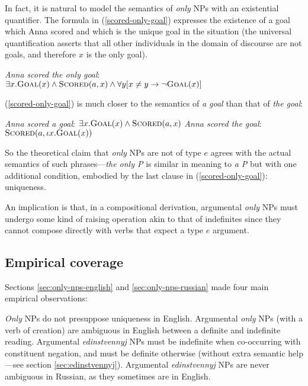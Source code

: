 In fact, it is natural to model the semantics of \textit{only} NPs with an existential quantifier. The formula in (\ref{scored-only-goal}) expresses the existence of a goal which Anna scored and which is the unique goal in the situation (the universal quantification asserts that all other individuals in the domain of discourse are not goals, and therefore $x$ is the only goal).

\begin{exe}
	\ex \label{scored-only-goal} \textit{Anna scored the only goal}: \\ $\exists x . \textsc{Goal}(x) \land \textsc{Scored}(a, x) \land \forall y [ x \ne y \to \neg \textsc{Goal}(x) ] $
\end{exe}

(\ref{scored-only-goal}) is much closer to the semantics of \textit{a goal} than that of \textit{the goal}:

\begin{exe}
	\ex \label{a-goal} \textit{Anna scored a goal}: $\exists x . \textsc{Goal}(x) \land \textsc{Scored}(a, x)$
	\ex \label{the-goal} \textit{Anna scored the goal}: $\textsc{Scored}(a, \iota x . \textsc{Goal}(x))$
\end{exe}

So the theoretical claim that \textit{only} NPs are not of type $e$ agrees with the actual semantics of such phrases---\textit{the only P} is similar in meaning to \textit{a P} but with one additional condition, embodied by the last clause in (\ref{scored-only-goal}): uniqueness.

An implication is that, in a compositional derivation, argumental \textit{only} NPs must undergo some kind of raising operation akin to that of indefinites since they cannot compose directly with verbs that expect a type $e$ argument.

\subsection{Empirical coverage}
Sections \ref{sec:only-nps-english} and \ref{sec:only-nps-russian} made four main empirical observations:

\begin{exe}
	\ex \label{empirical1} \textit{Only} NPs do not presuppose uniqueness in English.
	\ex \label{empirical2} Argumental \textit{only} NPs (with a verb of creation) are ambiguous in English between a definite and indefinite reading.
	\ex \label{empirical3} Argumental \textit{edinstvennyj} NPs must be indefinite when co-occurring with constituent negation, and must be definite otherwise (without extra semantic help---see section \ref{sec:edinstvennyj}).
	\ex \label{empirical4} Argumental \textit{edinstvennyj} NPs are never ambiguous in Russian, as they sometimes are in English.
\end{exe}

